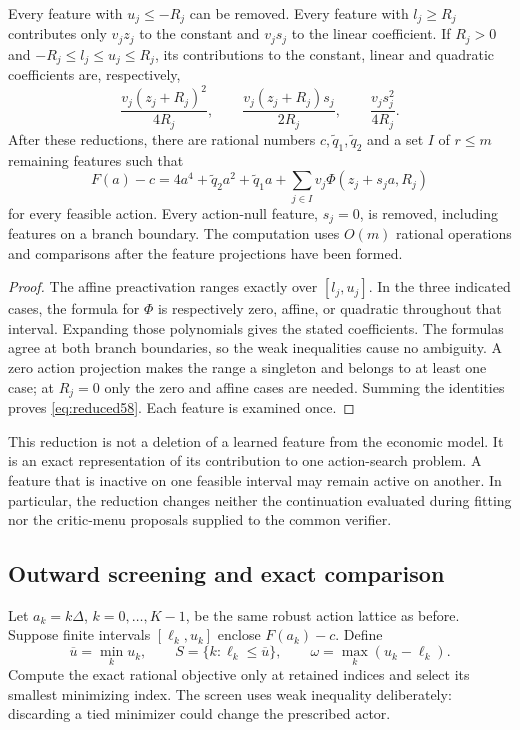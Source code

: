\begin{lemma}\label{lem:regions58}
Every feature with $u_j\le -R_j$ can be removed. Every feature with $l_j\ge R_j$ contributes only $v_jz_j$ to the constant and $v_js_j$ to the linear coefficient. If $R_j>0$ and $-R_j\le l_j\le u_j\le R_j$, its contributions to the constant, linear and quadratic coefficients are, respectively,
\[
 \frac{v_j(z_j+R_j)^2}{4R_j},\qquad
 \frac{v_j(z_j+R_j)s_j}{2R_j},\qquad
 \frac{v_js_j^2}{4R_j}.
\]
After these reductions, there are rational numbers $c,\widetilde q_1,\widetilde q_2$ and a set $I$ of $r\le m$ remaining features such that
\begin{equation}\label{eq:reduced58}
 F(a)-c=4a^4+\widetilde q_2a^2+\widetilde q_1a+
              \sum_{j\in I}v_j\Phi(z_j+s_ja,R_j)
\end{equation}
for every feasible action. Every action-null feature, $s_j=0$, is removed, including features on a branch boundary. The computation uses $O(m)$ rational operations and comparisons after the feature projections have been formed.
\end{lemma}
\begin{proof}
The affine preactivation ranges exactly over $[l_j,u_j]$. In the three indicated cases, the formula for $\Phi$ is respectively zero, affine, or quadratic throughout that interval. Expanding those polynomials gives the stated coefficients. The formulas agree at both branch boundaries, so the weak inequalities cause no ambiguity. A zero action projection makes the range a singleton and belongs to at least one case; at $R_j=0$ only the zero and affine cases are needed. Summing the identities proves \eqref{eq:reduced58}. Each feature is examined once.
\end{proof}

This reduction is not a deletion of a learned feature from the economic model. It is an exact representation of its contribution to one action-search problem. A feature that is inactive on one feasible interval may remain active on another. In particular, the reduction changes neither the continuation evaluated during fitting nor the critic-menu proposals supplied to the common verifier.

\subsection{Outward screening and exact comparison}
Let $a_k=k\Delta$, $k=0,\ldots,K-1$, be the same robust action lattice as before. Suppose finite intervals $[\ell_k,u_k]$ enclose $F(a_k)-c$. Define
\begin{equation}\label{eq:screen58}
 \overline u=\min_k u_k,\qquad
 S=\{k:\ell_k\le\overline u\},\qquad
 \omega=\max_k(u_k-\ell_k).
\end{equation}
Compute the exact rational objective only at retained indices and select its smallest minimizing index. The screen uses weak inequality deliberately: discarding a tied minimizer could change the prescribed actor.


